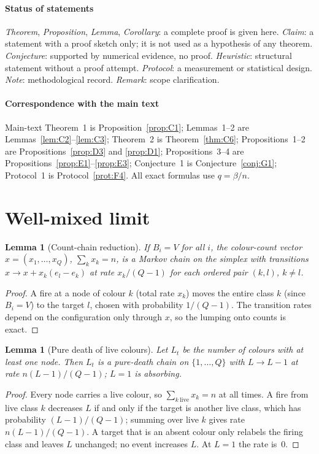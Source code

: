 \documentclass[pdflatex,sn-mathphys-num]{sn-jnl}
\theoremstyle{thmstyleone}%
\newtheorem{lemma}[theorem]{Lemma}
\theoremstyle{thmstylethree}%
\theoremstyle{thmstyletwo}%
\begin{document}
\paragraph{Status of statements}
\emph{Theorem}, \emph{Proposition}, \emph{Lemma}, \emph{Corollary}: a
complete proof is given here. \emph{Claim}: a statement with a proof
sketch only; it is not used as a hypothesis of any theorem.
\emph{Conjecture}: supported by numerical evidence, no proof.
\emph{Heuristic}: structural statement without a proof attempt.
\emph{Protocol}: a measurement or statistical design. \emph{Note}:
methodological record. \emph{Remark}: scope clarification.

\paragraph{Correspondence with the main text}
Main-text Theorem~1 is Proposition~\ref{prop:C1}; Lemmas~1--2 are
Lemmas~\ref{lem:C2}--\ref{lem:C3}; Theorem~2 is Theorem~\ref{thm:C6};
Propositions~1--2 are Propositions~\ref{prop:D3} and \ref{prop:D1};
Propositions~3--4 are Propositions~\ref{prop:E1}--\ref{prop:E3};
Conjecture~1 is Conjecture~\ref{conj:G1}; Protocol~1 is
Protocol~\ref{prot:F4}. All exact formulas use $q=\beta/n$.

\section{Well-mixed limit}
\label{sec:A}

\begin{lemma}[Count-chain reduction]
\label{lem:A1}
If $B_i=V$ for all $i$, the colour-count vector $x=(x_1,\dots,x_Q)$,
$\sum_k x_k=n$, is a Markov chain on the simplex with transitions
$x\to x+x_k(e_l-e_k)$ at rate $x_k/(Q-1)$ for each ordered pair $(k,l)$,
$k\neq l$.
\end{lemma}
\begin{proof}
A fire at a node of colour $k$ (total rate $x_k$) moves the entire class
$k$ (since $B_i=V$) to the target $l$, chosen with probability $1/(Q-1)$.
The transition rates depend on the configuration only through $x$, so the
lumping onto counts is exact.
\end{proof}

\begin{lemma}[Pure death of live colours]
\label{lem:A2}
Let $L_t$ be the number of colours with at least one node. Then $L_t$ is
a pure-death chain on $\{1,\dots,Q\}$ with $L\to L-1$ at rate
$n(L-1)/(Q-1)$; $L=1$ is absorbing.
\end{lemma}
\begin{proof}
Every node carries a live colour, so $\sum_{k\ \mathrm{live}}x_k=n$ at all
times. A fire from live class $k$ decreases $L$ if and only if the target
is another live class, which has probability $(L-1)/(Q-1)$; summing over
live $k$ gives rate $n(L-1)/(Q-1)$. A target that is an absent colour only
relabels the firing class and leaves $L$ unchanged; no event increases
$L$. At $L=1$ the rate is~0.
\end{proof}
\end{document}
